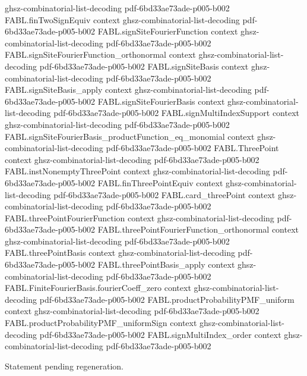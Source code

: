 \begin{theorem}
  {ghsz-combinatorial-list-decoding}
  {pdf-6bd33ae73ade-p005-b002}
\proofstep
  {FABL.finTwoSignEquiv}
  {context}
  {ghsz-combinatorial-list-decoding}
  {pdf-6bd33ae73ade-p005-b002}
\proofstep
  {FABL.signSiteFourierFunction}
  {context}
  {ghsz-combinatorial-list-decoding}
  {pdf-6bd33ae73ade-p005-b002}
\proofstep
  {FABL.signSiteFourierFunction_orthonormal}
  {context}
  {ghsz-combinatorial-list-decoding}
  {pdf-6bd33ae73ade-p005-b002}
\proofstep
  {FABL.signSiteBasis}
  {context}
  {ghsz-combinatorial-list-decoding}
  {pdf-6bd33ae73ade-p005-b002}
\proofstep
  {FABL.signSiteBasis_apply}
  {context}
  {ghsz-combinatorial-list-decoding}
  {pdf-6bd33ae73ade-p005-b002}
\proofstep
  {FABL.signSiteFourierBasis}
  {context}
  {ghsz-combinatorial-list-decoding}
  {pdf-6bd33ae73ade-p005-b002}
\proofstep
  {FABL.signMultiIndexSupport}
  {context}
  {ghsz-combinatorial-list-decoding}
  {pdf-6bd33ae73ade-p005-b002}
\proofstep
  {FABL.signSiteFourierBasis_productFunction_eq_monomial}
  {context}
  {ghsz-combinatorial-list-decoding}
  {pdf-6bd33ae73ade-p005-b002}
\proofstep
  {FABL.ThreePoint}
  {context}
  {ghsz-combinatorial-list-decoding}
  {pdf-6bd33ae73ade-p005-b002}
\proofstep
  {FABL.instNonemptyThreePoint}
  {context}
  {ghsz-combinatorial-list-decoding}
  {pdf-6bd33ae73ade-p005-b002}
\proofstep
  {FABL.finThreePointEquiv}
  {context}
  {ghsz-combinatorial-list-decoding}
  {pdf-6bd33ae73ade-p005-b002}
\proofstep
  {FABL.card_threePoint}
  {context}
  {ghsz-combinatorial-list-decoding}
  {pdf-6bd33ae73ade-p005-b002}
\proofstep
  {FABL.threePointFourierFunction}
  {context}
  {ghsz-combinatorial-list-decoding}
  {pdf-6bd33ae73ade-p005-b002}
\proofstep
  {FABL.threePointFourierFunction_orthonormal}
  {context}
  {ghsz-combinatorial-list-decoding}
  {pdf-6bd33ae73ade-p005-b002}
\proofstep
  {FABL.threePointBasis}
  {context}
  {ghsz-combinatorial-list-decoding}
  {pdf-6bd33ae73ade-p005-b002}
\proofstep
  {FABL.threePointBasis_apply}
  {context}
  {ghsz-combinatorial-list-decoding}
  {pdf-6bd33ae73ade-p005-b002}
\proofstep
  {FABL.FiniteFourierBasis.fourierCoeff_zero}
  {context}
  {ghsz-combinatorial-list-decoding}
  {pdf-6bd33ae73ade-p005-b002}
\proofstep
  {FABL.productProbabilityPMF_uniform}
  {context}
  {ghsz-combinatorial-list-decoding}
  {pdf-6bd33ae73ade-p005-b002}
\proofstep
  {FABL.productProbabilityPMF_uniformSign}
  {context}
  {ghsz-combinatorial-list-decoding}
  {pdf-6bd33ae73ade-p005-b002}
\proofstep
  {FABL.signMultiIndex_order}
  {context}
  {ghsz-combinatorial-list-decoding}
  {pdf-6bd33ae73ade-p005-b002}

Statement pending regeneration.
\end{theorem}


